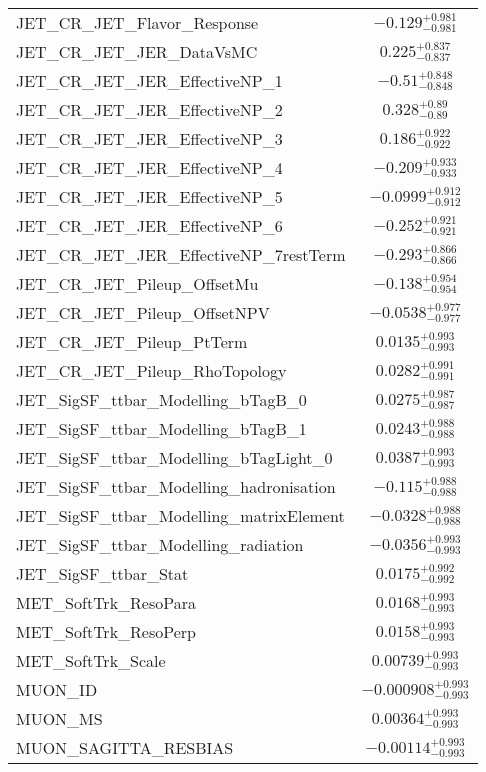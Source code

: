 \begin{tabular}{|l|c|}
JET\_CR\_JET\_Flavor\_Response & $-0.129^{+0.981}_{-0.981}$ \\
JET\_CR\_JET\_JER\_DataVsMC & $0.225^{+0.837}_{-0.837}$ \\
JET\_CR\_JET\_JER\_EffectiveNP\_1 & $-0.51^{+0.848}_{-0.848}$ \\
JET\_CR\_JET\_JER\_EffectiveNP\_2 & $0.328^{+0.89}_{-0.89}$ \\
JET\_CR\_JET\_JER\_EffectiveNP\_3 & $0.186^{+0.922}_{-0.922}$ \\
JET\_CR\_JET\_JER\_EffectiveNP\_4 & $-0.209^{+0.933}_{-0.933}$ \\
JET\_CR\_JET\_JER\_EffectiveNP\_5 & $-0.0999^{+0.912}_{-0.912}$ \\
JET\_CR\_JET\_JER\_EffectiveNP\_6 & $-0.252^{+0.921}_{-0.921}$ \\
JET\_CR\_JET\_JER\_EffectiveNP\_7restTerm & $-0.293^{+0.866}_{-0.866}$ \\
JET\_CR\_JET\_Pileup\_OffsetMu & $-0.138^{+0.954}_{-0.954}$ \\
JET\_CR\_JET\_Pileup\_OffsetNPV & $-0.0538^{+0.977}_{-0.977}$ \\
JET\_CR\_JET\_Pileup\_PtTerm & $0.0135^{+0.993}_{-0.993}$ \\
JET\_CR\_JET\_Pileup\_RhoTopology & $0.0282^{+0.991}_{-0.991}$ \\
JET\_SigSF\_ttbar\_Modelling\_bTagB\_0 & $0.0275^{+0.987}_{-0.987}$ \\
JET\_SigSF\_ttbar\_Modelling\_bTagB\_1 & $0.0243^{+0.988}_{-0.988}$ \\
JET\_SigSF\_ttbar\_Modelling\_bTagLight\_0 & $0.0387^{+0.993}_{-0.993}$ \\
JET\_SigSF\_ttbar\_Modelling\_hadronisation & $-0.115^{+0.988}_{-0.988}$ \\
JET\_SigSF\_ttbar\_Modelling\_matrixElement & $-0.0328^{+0.988}_{-0.988}$ \\
JET\_SigSF\_ttbar\_Modelling\_radiation & $-0.0356^{+0.993}_{-0.993}$ \\
JET\_SigSF\_ttbar\_Stat & $0.0175^{+0.992}_{-0.992}$ \\
MET\_SoftTrk\_ResoPara & $0.0168^{+0.993}_{-0.993}$ \\
MET\_SoftTrk\_ResoPerp & $0.0158^{+0.993}_{-0.993}$ \\
MET\_SoftTrk\_Scale & $0.00739^{+0.993}_{-0.993}$ \\
MUON\_ID & $-0.000908^{+0.993}_{-0.993}$ \\
MUON\_MS & $0.00364^{+0.993}_{-0.993}$ \\
MUON\_SAGITTA\_RESBIAS & $-0.00114^{+0.993}_{-0.993}$ \\

\end{tabular}
